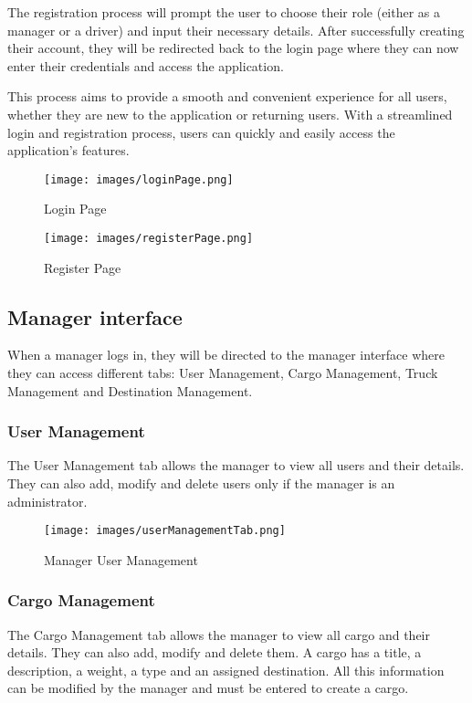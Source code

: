 \documentclass{article}
\begin{document}
The registration process will prompt the user to choose their role (either as a manager or 
a driver) and input their necessary details. After successfully creating their account, 
they will be redirected back to the login page where they can now enter their credentials 
and access the application.

This process aims to provide a smooth and convenient experience for all users,
whether they are new to the application or returning users. With a streamlined login 
and registration process, users can quickly and easily access the application's features.

\begin{figure}[ht]
    \begin{minipage}[c]{.37\textwidth}
        \centering
        \texttt{[image: images/loginPage.png]}
        \caption{Login Page}
    \end{minipage}
    \hfill
    \begin{minipage}[c]{.55\textwidth}
        \centering
        \texttt{[image: images/registerPage.png]}
        \caption{Register Page}
    \end{minipage}
\end{figure}

\subsection{Manager interface}
When a manager logs in, they will be directed to the manager interface where they can access
different tabs: User Management, Cargo Management, Truck Management and Destination Management.

\subsubsection{User Management}
The User Management tab allows the manager to view all users and their details. They can also
add, modify and delete users only if the manager is an administrator.

\begin{figure}[h]
    \centering
    \texttt{[image: images/userManagementTab.png]}
    \caption{Manager User Management}
\end{figure}

\subsubsection{Cargo Management}
The Cargo Management tab allows the manager to view all cargo and their details. They can also
add, modify and delete them. A cargo has a title, a description, a weight, a type and an assigned 
destination. All this information can be modified by the manager and must be entered to create a cargo.
\end{document}
